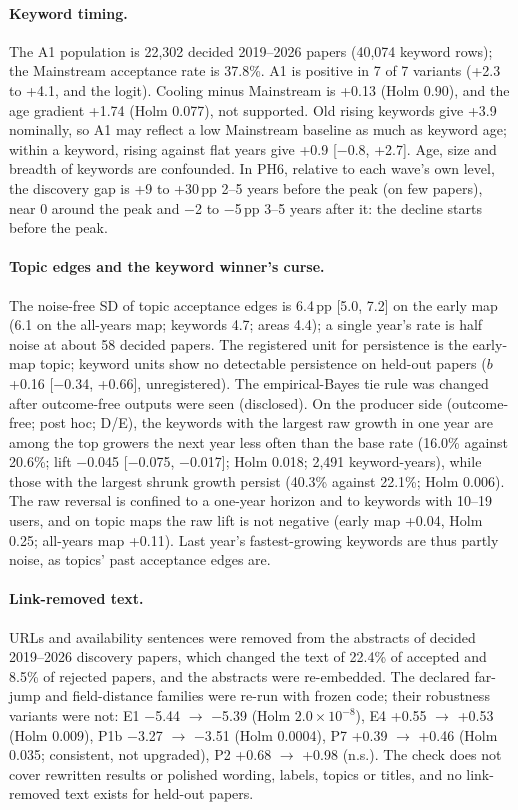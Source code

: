 \paragraph{Keyword timing.} The A1 population is 22,302 decided 2019--2026 papers (40,074 keyword rows); the
Mainstream acceptance rate is 37.8\%. A1 is positive in 7 of 7 variants (+2.3 to +4.1, and the logit). Cooling minus
Mainstream is +0.13 (Holm 0.90), and the age gradient +1.74 (Holm 0.077), not supported. Old rising keywords give
+3.9 nominally, so A1 may reflect a low Mainstream baseline as much as keyword age; within a keyword, rising against
flat years give +0.9 [$-$0.8, +2.7]. Age, size and breadth of keywords are confounded. In PH6, relative to each wave's own
level, the discovery gap is +9 to +30\,pp 2--5 years before the peak (on few papers), near 0 around the peak and $-$2
to $-$5\,pp 3--5 years after it: the decline starts before the peak.

\paragraph{Topic edges and the keyword winner's curse.} The noise-free SD of topic acceptance edges is 6.4\,pp [5.0,
7.2] on the early map (6.1 on the all-years map; keywords 4.7; areas 4.4); a single year's rate is half noise at about
58 decided papers. The registered unit for persistence is the early-map topic; keyword units show no detectable
persistence on held-out papers ($b$ +0.16 [$-$0.34, +0.66], unregistered). The empirical-Bayes tie rule was changed
after outcome-free outputs were seen (disclosed). On the producer side (outcome-free; post hoc; D/E), the keywords
with the largest raw growth in one year are among the top growers the next year less often than the base rate (16.0\%
against 20.6\%; lift $-$0.045 [$-$0.075, $-$0.017]; Holm 0.018; 2,491 keyword-years), while those with the largest
shrunk growth persist (40.3\% against 22.1\%; Holm 0.006). The raw reversal is confined to a one-year horizon and to
keywords with 10--19 users, and on topic maps the raw lift is not negative (early map +0.04, Holm 0.25; all-years map
+0.11). Last year's fastest-growing keywords are thus partly noise, as topics' past acceptance edges are.

\paragraph{Link-removed text.} URLs and availability sentences were removed from the abstracts of decided 2019--2026
discovery papers, which changed the text of 22.4\% of accepted and 8.5\% of rejected papers, and the abstracts were
re-embedded. The declared far-jump and field-distance families were re-run with frozen code; their robustness
variants were not: E1 $-$5.44 $\to$ $-$5.39 (Holm $2.0\times10^{-8}$),
E4 +0.55 $\to$ +0.53 (Holm 0.009), P1b $-$3.27 $\to$ $-$3.51 (Holm 0.0004), P7 +0.39 $\to$ +0.46 (Holm 0.035;
consistent, not upgraded), P2 +0.68 $\to$ +0.98 (n.s.). The check does not cover rewritten results or polished
wording, labels, topics or titles, and no link-removed text exists for held-out papers.

